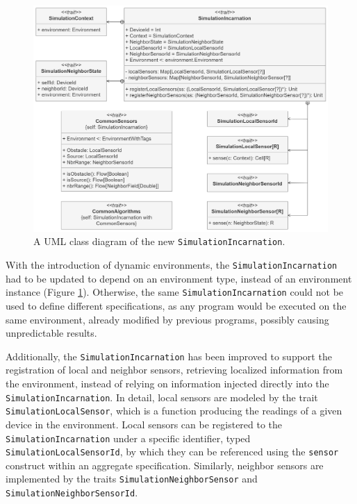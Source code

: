 \begin{figure}[!ht]
  \centering
  \includegraphics[width=1\textwidth]{resources/figures/diagrams/short/simulation-incarnation-class-diagram.pdf}
  \caption[A UML class diagram of the updated simulation incarnation]{
    A UML class diagram of the new \texttt{SimulationIncarnation}.
  }
  \label{figure:simulation-incarnation-class-diagram}
\end{figure}

With the introduction of dynamic environments, the
\texttt{SimulationIncarnation} had to be updated to depend on an environment
type, instead of an environment instance (Figure
\ref{figure:simulation-incarnation-class-diagram}). Otherwise, the same
\texttt{SimulationIncarnation} could not be used to define different
specifications, as any program would be executed on the same environment,
already modified by previous programs, possibly causing unpredictable results.

Additionally, the \texttt{SimulationIncarnation} has been improved to support
the registration of local and neighbor sensors, retrieving localized
information from the environment, instead of relying on information injected
directly into the \texttt{Simu\-lationIncarnation}. In detail, local sensors
are modeled by the trait \texttt{Simula\-tionLocalSensor}, which is a function
producing the readings of a given device in the environment. Local sensors can
be registered to the \texttt{SimulationIncar\-nation} under a specific
identifier, typed \texttt{SimulationLocalSensorId}, by which they can be
referenced using the \texttt{sensor} construct within an aggregate
specification. Similarly, neighbor sensors are implemented by the traits
\texttt{SimulationNeighbor\-Sensor} and \texttt{Simulation\-NeighborSensorId}.

